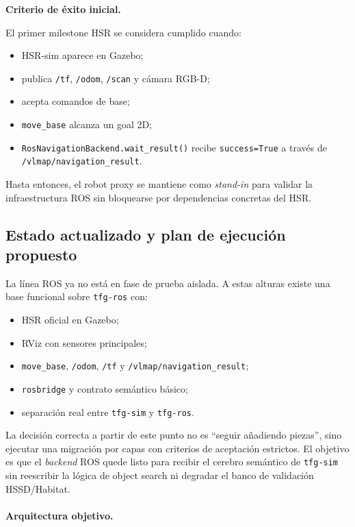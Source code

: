 \documentclass[11pt,a4paper]{article}
\begin{document}
\textbf{Criterio de éxito inicial.}

El primer milestone HSR se considera cumplido cuando:

\begin{itemize}
  \item HSR-sim aparece en Gazebo;
  \item publica \texttt{/tf}, \texttt{/odom}, \texttt{/scan} y cámara RGB-D;
  \item acepta comandos de base;
  \item \texttt{move\_base} alcanza un goal 2D;
  \item \texttt{RosNavigationBackend.wait\_result()} recibe
        \texttt{success=True} a través de \texttt{/vlmap/navigation\_result}.
\end{itemize}

Hasta entonces, el robot proxy se mantiene como \emph{stand-in} para validar la
infraestructura ROS sin bloquearse por dependencias concretas del HSR.

\subsection*{Estado actualizado y plan de ejecución propuesto}

La línea ROS ya no está en fase de prueba aislada. A estas alturas existe una
base funcional sobre \texttt{tfg-ros} con:

\begin{itemize}
  \item HSR oficial en Gazebo;
  \item RViz con sensores principales;
  \item \texttt{move\_base}, \texttt{/odom}, \texttt{/tf} y
        \texttt{/vlmap/navigation\_result};
  \item \texttt{rosbridge} y contrato semántico básico;
  \item separación real entre \texttt{tfg-sim} y \texttt{tfg-ros}.
\end{itemize}

La decisión correcta a partir de este punto no es ``seguir añadiendo piezas'',
sino ejecutar una migración por capas con criterios de aceptación estrictos.
El objetivo es que el \emph{backend} ROS quede listo para recibir el cerebro
semántico de \texttt{tfg-sim} sin reescribir la lógica de object search ni
degradar el banco de validación HSSD/Habitat.

\paragraph{Arquitectura objetivo.}
\end{document}
